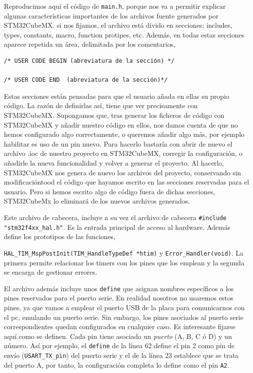 Reproducimos aquí el código de \texttt{main.h}, porque nos va a permitir explicar algunas características importantes de los archivos fuente generados por STM32CubeMX. si nos fijamos, el archivo está divido en secciones: includes, types, constants, macro, function protipes, etc. Además, en todas estas secciones aparece repetida un área, delimitada por los comentarios,
\begin{verbatim}
/* USER CODE BEGIN (abreviatura de la sección) */

/* USER CODE END  (abreviatura de la sección)*/
\end{verbatim}

Estas secciones están pensadas para que el usuario añada en ellas su propio código. La razón de definirlas así, tiene que ver precisamente con STM32CubeMX. Supongamos que, tras generar los ficheros de código con STM32CubeMX y añadir nuestro código en ellos, nos damos cuenta de que no hemos configurado algo correctamente, o queremos añadir algo más, por ejemplo habilitar es uso de un pin nuevo. Para hacerlo bastaría con abrir de nuevo el archivo .ioc de nuestro proyecto en STM32CubeMX, corregir la configuración, o añadirle la nueva funcionalidad y volver a generar el proyecto. Al hacerlo, STM32CubeMX nos genera de nuevo los archivos del proyecto, conservando sin modificacióntood el código que hayamos escrito en las secciones reservadas para el usuario. Pero si hemos escrito algo de código fuera de dichas secciones, STM32CubeMx lo eliminará de los nuevos archivos generados.

Este archivo de cabecera, incluye a su vez el archivo de cabecera \texttt{\#include "stm32f4xx\_hal.h"}. 
Es la entrada principal de acceso al hardware. Además define los prototipos de las funciones,

\texttt{HAL\_TIM\_MspPostInit(TIM\_HandleTypeDef *htim)} y \texttt{Error\_Handler(void)}. La primera permite relacionar los timers con los pines que los emplean y la segunda se encarga de gestionar errores.

El archivo además incluye unos \texttt{define} que asignan nombres específicos a los pines reservados para el puerto serie. En realidad nosotros no usaremos estos pines, ya que vamos a emplear el puerto USB de la placa para comunicarnos con el pc, emulando un puerto serie. Sin embargo, los pines asociados al puerto serie correspondientes quedan configurados en cualquier caso. Es interesante fijarse aquí como se definen. Cada pin tiene asociado un \emph{puerto} (A, B, C ó D) y un número. Así por ejemplo, el \texttt{define} de la línea 62 define el pin 2 como pin de envío (\texttt{USART\_TX\_pin}) del puerto serie y el de la línea 23 establece que se trata del puerto A, por tanto, la configuración completa lo define como el pin \texttt{A2}.

